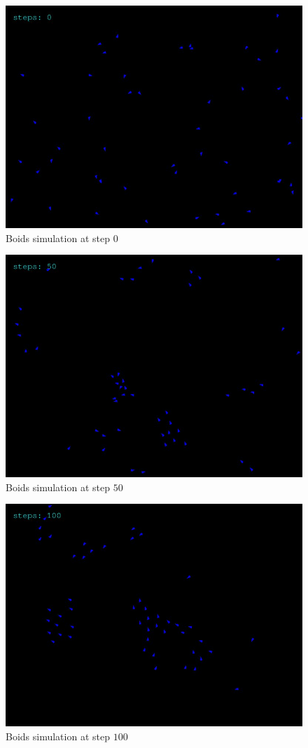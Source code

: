 \documentclass[9pt]{pnas-new}
\begin{document}
\begin{figure}[h]
	\centering
	\includegraphics[width=0.8\linewidth]{boids_step_0.jpg}
	\caption{Boids simulation at step $0$}
\end{figure}
\begin{figure}[h]
	\centering
	\includegraphics[width=0.8\linewidth]{boids_step_50.jpg}
	\caption{Boids simulation at step $50$}
\end{figure}
\begin{figure}[h]
	\centering
	\includegraphics[width=0.8\linewidth]{boids_step_100.jpg}
	\caption{Boids simulation at step $100$}
\end{figure}
\end{document}
